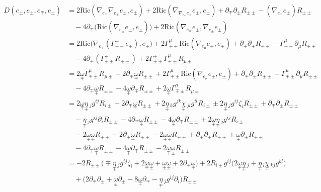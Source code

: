\documentclass[a4paper,11pt]{article}
\numberwithin{equation}{section}
\theoremstyle{definition}
\newcommand{\R}{{\mathrm{Ric}}}
\begin{document}
\begin{align*}
    D(e_\pm,e_\pm, e_\mp, e_\pm) 
    &=2\R(\nabla_{e_\mp}\nabla_{{e_\pm}} e_\pm ,e_\pm )
    + 2\R(\nabla_{\nabla_{e_\mp}{e_\pm}} e_\pm ,e_\pm )
    + \partial_\mp \partial_\pm R_{\pm\pm}
    -(\nabla_{e_\mp} {e_\pm})R_{\pm\pm}\\
    &\quad 
    -4 \partial_\mp\big(\R(\nabla_{{e_\pm}} e_\pm , e_\pm )\big)
    + 2 \R(\nabla_{e_\mp} e_\pm , \nabla_{{e_\pm}} e_\pm ) \\
    &=2\R\big(\nabla_{e_\mp}(\Gamma_{\pm\pm}^\pm e_\pm) ,e_\pm \big)
    + 2\Gamma_{\mp\pm}^\mu \R(\nabla_{e_\mu} e_\pm ,e_\pm )
    + \partial_\mp \partial_\pm R_{\pm\pm}
    -\Gamma_{\mp\pm}^\mu \partial_\mu R_{\pm\pm}\\
    &\quad 
    -4 \partial_\mp(\Gamma_{\pm\pm}^\pm R_{\pm\pm})
    + 2 \Gamma_{\pm\pm}^\pm \Gamma_{\mp\pm}^\mu R_{\mu\pm}\\
    &=2\underset{\mp}{\omega} \Gamma_{\mp\pm}^\mu R_{\mu\pm}
    + 2 \partial_\mp \underset{\mp}{\omega} R_{\pm\pm}
    + 2\Gamma_{\mp\pm}^\mu \R(\nabla_{e_\mu} e_\pm ,e_\pm )
    + \partial_\mp \partial_\pm R_{\pm\pm}
    -\Gamma_{\mp\pm}^\mu \partial_\mu R_{\pm\pm}\\
    &\quad 
    -4 \partial_\mp\underset{\mp}{\omega} R_{\pm\pm}
    -4 \underset{\mp}{\omega} \partial_\mp R_{\pm\pm}
    + 2 \underset{\mp}{\omega} \Gamma_{\mp\pm}^\mu R_{\mu\pm}\\
    &=2\underset{\mp}{\omega} \underset{\mp}{\eta}\,_j g^{ij} R_{i \pm}
    + 2 \partial_\mp \underset{\mp}{\omega} R_{\pm\pm}
    + 2\underset{\mp}{\eta}\,_k g^{jk} \underset{\mp}{\chi}\,_{jl}g^{il} R_{i\pm}
    \pm 2\underset{\mp}{\eta}\,_j g^{ij} \zeta_i R_{\pm\pm}
    + \partial_\mp \partial_\pm R_{\pm\pm}\\
    &\quad 
    -\underset{\mp}{\eta}\,_j g^{ij} \partial_i  R_{\pm\pm}
    -4 \partial_\mp\underset{\mp}{\omega} R_{\pm\pm}
    -4 \underset{\mp}{\omega} \partial_\mp R_{\pm\pm}
    + 2 \underset{\mp}{\omega} \underset{\mp}{\eta}\,_j g^{ij} R_{i \pm}\\
    &\quad - 2\underset{\mp}{\omega} \underset{\pm}{\omega} R_{\pm\pm}
    + 2 \partial_\mp \underset{\mp}{\omega} R_{\pm\pm}
    - 2\underset{\pm}{\omega} \underset{\pm}{\omega} R_{\pm\pm}
    + \partial_\mp \partial_\pm R_{\pm\pm}
    +\underset{\pm}{\omega} \partial_\pm R_{\pm\pm}\\
    &\quad 
    -4 \partial_\mp\underset{\mp}{\omega} R_{\pm\pm}
    -4 \underset{\mp}{\omega} \partial_\mp R_{\pm\pm}
    - 2 \underset{\mp}{\omega} \underset{\pm}{\omega} R_{\pm\pm}\\
    &= - 2 R_{\pm\pm} \Big(
    \mp \underset{\mp}{\eta}\,_j g^{ij} \zeta_i
    + 2 \underset{\mp}{\omega} \underset{\pm}{\omega}
    + \underset{\pm}{\omega} \underset{\pm}{\omega}
    +2 \partial_\mp\underset{\mp}{\omega} \Big)
    + 2 R_{i\pm} g^{ij} \Big(2 \underset{\mp}{\omega} \underset{\mp}{\eta}\,_j 
    + \underset{\mp}{\eta}\,_l \underset{\mp}{\chi}\,_{kj} g^{kl} \Big)\\
    &\quad
    + \Big(2 \partial_\mp \partial_\pm
    +\underset{\pm}{\omega} \partial_\pm
    -8 \underset{\mp}{\omega} \partial_\mp
    -\underset{\mp}{\eta}\,_j g^{ij} \partial_i  \Big) R_{\pm\pm}
\end{align*}
\end{document}
